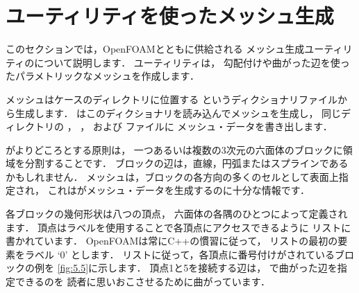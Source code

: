 \begin{table}[p]
\end{table}



\section{ユーティリティを使ったメッシュ生成}
\label{sec:5.3}
%
%
%
このセクションでは，OpenFOAMとともに供給される
メッシュ生成ユーティリティのについて説明します．
ユーティリティは，
%
勾配付けや曲がった辺を使ったパラメトリックなメッシュを作成します．

メッシュはケースのディレクトリに位置する
%
%
というディクショナリファイルから生成します．
はこのディクショナリを読み込んでメッシュを生成し，
同じディレクトリの
%
%
，
%
%
，
%
%
および
%
%
ファイルに
メッシュ・データを書き出します．

がよりどころとする原則は，
一つあるいは複数の3次元の六面体のブロックに領域を分割することです．
ブロックの辺は，直線，円弧またはスプラインであるかもしれません．
メッシュは，ブロックの各方向の多くのセルとして表面上指定され，
これはがメッシュ・データを生成するのに十分な情報です．

各ブロックの幾何形状は八つの頂点，
六面体の各隅のひとつによって定義されます．
頂点はラベルを使用することで各頂点にアクセスできるように
リストに書かれています． OpenFOAMは常にC++の慣習に従って，
リストの最初の要素をラベル `0' とします．
リストに従って，各頂点に番号付けがされているブロックの例を
\autoref{fig:5.5}に示します．
頂点1と5を接続する辺は，
で曲がった辺を指定できるのを
読者に思いおこさせるために曲がっています．

